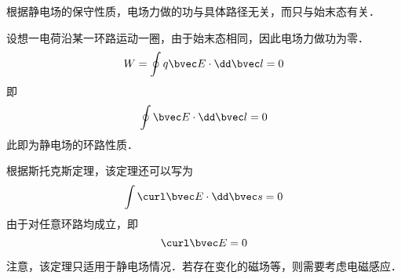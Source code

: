 
根据静电场的保守性质，电场力做的功与具体路径无关，而只与始末态有关．

设想一电荷沿某一环路运动一圈，由于始末态相同，因此电场力做功为零．
$$
W = \oint q\bvec E \cdot \dd \bvec l = 0
$$
即
\begin{equation}
\oint \bvec E \cdot \dd \bvec l = 0
\end{equation}
此即为静电场的环路性质．

根据斯托克斯定理，该定理还可以写为
$$\int \curl \bvec E \cdot \dd \bvec s = 0$$
由于对任意环路均成立，即
\begin{equation}
\curl \bvec E = 0
\end{equation}

注意，该定理只适用于静电场情况．若存在变化的磁场等，则需要考虑电磁感应．
